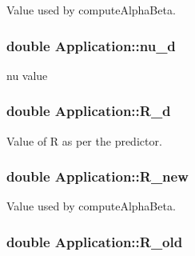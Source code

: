 Value used by compute\-Alpha\-Beta. 

\hypertarget{classApplication_a42c22b9a3130cf1f2722ce222f2e5bae}{
\subsubsection[{nu\-\_\-d}]{\setlength{\rightskip}{0pt plus 5cm}double Application\-::nu\-\_\-d\hspace{0.3cm}{\ttfamily [private]}}}\label{classApplication_a42c22b9a3130cf1f2722ce222f2e5bae}


nu value 

\hypertarget{classApplication_a374d43f68ae27aaed98278e8152a434c}{
\subsubsection[{R\-\_\-d}]{\setlength{\rightskip}{0pt plus 5cm}double Application\-::\-R\-\_\-d\hspace{0.3cm}{\ttfamily [private]}}}\label{classApplication_a374d43f68ae27aaed98278e8152a434c}


Value of R as per the predictor. 

\hypertarget{classApplication_a9e94824741ac0c52d0fa5ede30c72fa1}{
\subsubsection[{R\-\_\-new}]{\setlength{\rightskip}{0pt plus 5cm}double Application\-::\-R\-\_\-new\hspace{0.3cm}{\ttfamily [private]}}}\label{classApplication_a9e94824741ac0c52d0fa5ede30c72fa1}


Value used by compute\-Alpha\-Beta. 

\hypertarget{classApplication_a950cfc8da4a8e4640aee8d2840f53e0e}{
\subsubsection[{R\-\_\-old}]{\setlength{\rightskip}{0pt plus 5cm}double Application\-::\-R\-\_\-old\hspace{0.3cm}{\ttfamily [private]}}}\label{classApplication_a950cfc8da4a8e4640aee8d2840f53e0e}


